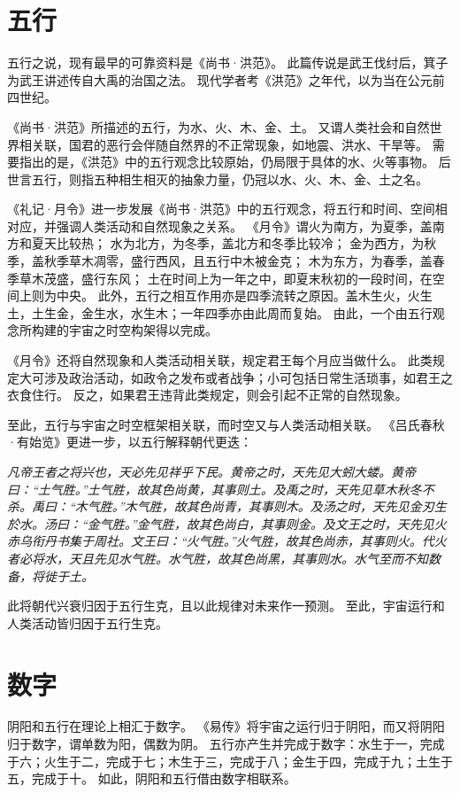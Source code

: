\documentclass[11pt]{article}
\begin{document}
\section{五行}
五行之说，现有最早的可靠资料是《尚书·洪范》。
此篇传说是武王伐纣后，箕子为武王讲述传自大禹的治国之法。
现代学者考《洪范》之年代，以为当在公元前四世纪。

\par

《尚书·洪范》所描述的五行，为水、火、木、金、土。
又谓人类社会和自然世界相关联，国君的恶行会伴随自然界的不正常现象，如地震、洪水、干旱等。
需要指出的是，《洪范》中的五行观念比较原始，仍局限于具体的水、火等事物。
后世言五行，则指五种相生相灭的抽象力量，仍冠以水、火、木、金、土之名。

\par

《礼记·月令》进一步发展《尚书·洪范》中的五行观念，将五行和时间、空间相对应，并强调人类活动和自然现象之关系。
《月令》谓火为南方，为夏季，盖南方和夏天比较热；
水为北方，为冬季，盖北方和冬季比较冷；
金为西方，为秋季，盖秋季草木凋零，盛行西风，且五行中木被金克；
木为东方，为春季，盖春季草木茂盛，盛行东风；
土在时间上为一年之中，即夏末秋初的一段时间，在空间上则为中央。
此外，五行之相互作用亦是四季流转之原因。盖木生火，火生土，土生金，金生水，水生木；一年四季亦由此周而复始。
由此，一个由五行观念所构建的宇宙之时空构架得以完成。

\par

《月令》还将自然现象和人类活动相关联，规定君王每个月应当做什么。
此类规定大可涉及政治活动，如政令之发布或者战争；小可包括日常生活琐事，如君王之衣食住行。
反之，如果君王违背此类规定，则会引起不正常的自然现象。

\par

至此，五行与宇宙之时空框架相关联，而时空又与人类活动相关联。
《吕氏春秋·有始览》更进一步，以五行解释朝代更迭：
  
\textit{凡帝王者之将兴也，天必先见祥乎下民。黄帝之时，天先见大蚓大蝼。黄帝曰：“土气胜。”土气胜，故其色尚黄，其事则土。及禹之时，天先见草木秋冬不杀。禹曰：“木气胜。”木气胜，故其色尚青，其事则木。及汤之时，天先见金刃生於水。汤曰：“金气胜。”金气胜，故其色尚白，其事则金。及文王之时，天先见火赤乌衔丹书集于周社。文王曰：“火气胜。”火气胜，故其色尚赤，其事则火。代火者必将水，天且先见水气胜。水气胜，故其色尚黑，其事则水。水气至而不知数备，将徙于土。}

此将朝代兴衰归因于五行生克，且以此规律对未来作一预测。
至此，宇宙运行和人类活动皆归因于五行生克。
  
\section{数字}
阴阳和五行在理论上相汇于数字。
《易传》将宇宙之运行归于阴阳，而又将阴阳归于数字，谓单数为阳，偶数为阴。
五行亦产生并完成于数字：水生于一，完成于六；火生于二，完成于七；木生于三，完成于八；金生于四，完成于九；土生于五，完成于十。
如此，阴阳和五行借由数字相联系。
  
\end{document}
